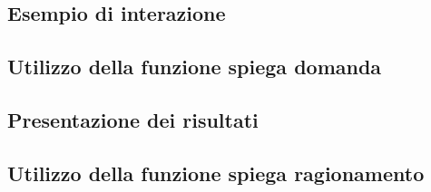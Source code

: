     
    

\subsection{Esempio di interazione}

\subsection{Utilizzo della funzione spiega domanda}

\subsection{Presentazione dei risultati}

\subsection{Utilizzo della funzione spiega ragionamento}
